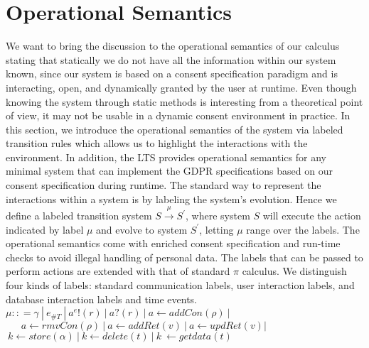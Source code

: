 

  

\section{Operational Semantics}
We want to bring the discussion to the operational semantics of our calculus stating 
that statically we do not have all the information within our system known,  since our system is based on a consent specification paradigm  and is interacting, open, and dynamically granted by the user at runtime. Even though knowing the system through static methods is interesting from a theoretical point of view, it may not be usable in a dynamic consent environment in practice. In this section, we introduce the operational semantics of the system via labeled transition rules which allows us to highlight the interactions with the environment.
In addition, the LTS provides operational semantics for any minimal system that can implement the GDPR specifications based on our consent specification during runtime. 
The standard way to represent the interactions within a system is by labeling the system's evolution. Hence we define a labeled transition system $ S \xrightarrow{\mu} S^{'}$, where system $S$ will execute the action indicated by label $ \mu $ and evolve to system $S^{'}$,
letting %
$ \mu$ %
range over the labels. The operational semantics come with enriched consent specification and run-time checks to avoid %
illegal handling of personal data. 
The labels that can be passed to perform actions are extended with that of standard $ \pi$  calculus. We distinguish four kinds of labels: standard communication labels, user interaction labels, and database interaction labels and time events.\\
$ \mu :: =  \gamma  \ | \ e_{\#T}  \ | \ a^e !(r) \ | \ a? (r) \ | \ a\leftarrow addCon(\rho) \ |  $
 $ \ \ \ \ \  \ \ a\leftarrow rmvCon( \rho) \ | \ a \leftarrow addRet(v) \ | \ a\leftarrow updRet( v) |  $
$ \  k \leftarrow store (\alpha) \ |  \  k \leftarrow delete (t) \  | \  k \  \leftarrow getdata (t)  $

